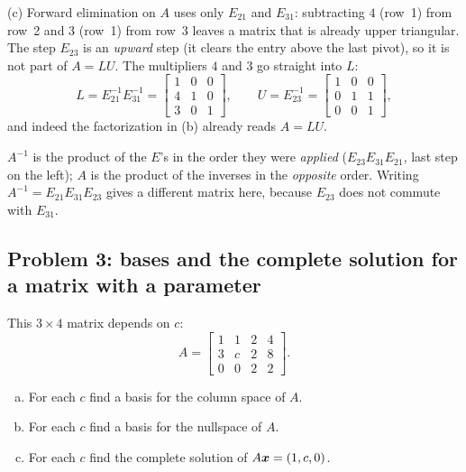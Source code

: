 \begin{solution}
(c) Forward elimination on $A$ uses only $E_{21}$ and $E_{31}$: subtracting $4$ (row~1) from
row~2 and $3$ (row~1) from row~3 leaves a matrix that is already upper triangular. The step $E_{23}$ is an \emph{upward} step (it clears the entry above the
last pivot), so it is not part of $A=LU$. The multipliers $4$ and $3$ go straight into $L$:
\[
  L=E_{21}^{-1}E_{31}^{-1}=\begin{bmatrix}1&0&0\\4&1&0\\3&0&1\end{bmatrix},\qquad
  U=E_{23}^{-1}=\begin{bmatrix}1&0&0\\0&1&1\\0&0&1\end{bmatrix},
\]
and indeed the factorization in (b) already reads $A=LU$.
\end{solution}

\begin{trap}
$A^{-1}$ is the product of the $E$'s in the order they were \emph{applied}
($E_{23}E_{31}E_{21}$, last step on the left); $A$ is the product of the inverses in the
\emph{opposite} order. Writing $A^{-1}=E_{21}E_{31}E_{23}$ gives a different matrix here,
because $E_{23}$ does not commute with $E_{31}$.
\end{trap}

\subsection{Problem 3: bases and the complete solution for a matrix with a parameter}

\begin{exercise}\label{ex:u15-p3}
This $3\times 4$ matrix depends on $c$:
\[
  A=\begin{bmatrix}1&1&2&4\\3&c&2&8\\0&0&2&2\end{bmatrix}.
\]
\begin{enumerate}[(a)]
  \item For each $c$ find a basis for the column space of $A$.
  \item For each $c$ find a basis for the nullspace of $A$.
  \item For each $c$ find the complete solution of $A\boldsymbol{x}=(1,c,0)$.
\end{enumerate}
\end{exercise}

